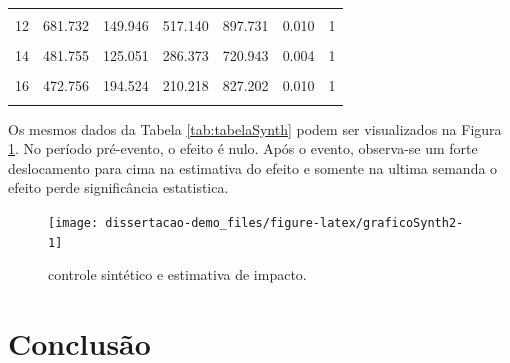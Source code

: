 \documentclass[
  12pt,
]{book}
\begin{document}
\begin{table}
\begin{tabular}[t]{rrrrrrr}
\hspace{1em}\cellcolor{gray!6}{11} & \cellcolor{gray!6}{1015.189} & \cellcolor{gray!6}{402.975} & \cellcolor{gray!6}{399.266} & \cellcolor{gray!6}{1843.734} & \cellcolor{gray!6}{0.006} & \cellcolor{gray!6}{1}\\
\hspace{1em}12 & 681.732 & 149.946 & 517.140 & 897.731 & 0.010 & 1\\
\hspace{1em}\cellcolor{gray!6}{13} & \cellcolor{gray!6}{684.822} & \cellcolor{gray!6}{222.379} & \cellcolor{gray!6}{419.485} & \cellcolor{gray!6}{1063.863} & \cellcolor{gray!6}{0.006} & \cellcolor{gray!6}{1}\\
14 & 481.755 & 125.051 & 286.373 & 720.943 & 0.004 & 1\\
\cellcolor{gray!6}{15} & \cellcolor{gray!6}{441.294} & \cellcolor{gray!6}{128.765} & \cellcolor{gray!6}{289.313} & \cellcolor{gray!6}{667.232} & \cellcolor{gray!6}{0.008} & \cellcolor{gray!6}{1}\\
16 & 472.756 & 194.524 & 210.218 & 827.202 & 0.010 & 1\\
\cellcolor{gray!6}{17} & \cellcolor{gray!6}{357.044} & \cellcolor{gray!6}{423.658} & \cellcolor{gray!6}{-256.200} & \cellcolor{gray!6}{1221.183} & \cellcolor{gray!6}{0.182} & \cellcolor{gray!6}{1}\\
\bottomrule
\end{tabular}
\end{table}

Os mesmos dados da Tabela \ref{tab:tabelaSynth} podem ser visualizados na Figura \ref{fig:graficoSynth2}. No período pré-evento, o efeito é nulo. Após o evento, observa-se um forte deslocamento para cima na estimativa do efeito e somente na ultima semanda o efeito perde significância estatistica.

\begin{figure}

{\centering \texttt{[image: dissertacao-demo\_files/figure-latex/graficoSynth2-1]} 

}

\caption{controle sintético e estimativa de impacto.}\label{fig:graficoSynth2}
\end{figure}

\hypertarget{conclusuxe3o}{%
\chapter{Conclusão}\label{conclusuxe3o}}
\end{document}
